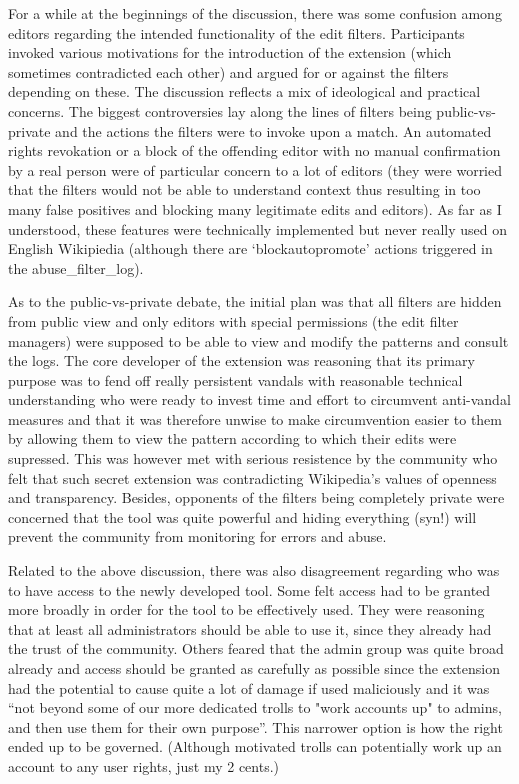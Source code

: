 For a while at the beginnings of the discussion, there was some confusion among editors regarding the intended functionality of the edit filters.
Participants invoked various motivations for the introduction of the extension (which sometimes contradicted each other) and argued for or against the filters depending on these.
The discussion reflects a mix of ideological and practical concerns.
The biggest controversies lay along the lines of filters being public-vs-private and the actions the filters were to invoke upon a match.
An automated rights revokation or a block of the offending editor with no manual confirmation by a real person were of particular concern to a lot of editors (they were worried that the filters would not be able to understand context thus resulting in too many false positives and blocking many legitimate edits and editors).
As far as I understood, these features were technically implemented but never really used on English Wikipiedia (although there are `blockautopromote' actions triggered in the abuse\_filter\_log). %

As to the public-vs-private debate, the initial plan was that all filters are hidden from public view and only editors with special permissions (the edit filter managers) were supposed to be able to view and modify the patterns and consult the logs.
The core developer of the extension was reasoning that its primary purpose was to fend off really persistent vandals with reasonable technical understanding who were ready to invest time and effort to circumvent anti-vandal measures
and that it was therefore unwise to make circumvention easier to them by allowing them to view the pattern according to which their edits were supressed.
This was however met with serious resistence by the community who felt that such secret extension was contradicting Wikipedia's values of openness and transparency.
Besides, opponents of the filters being completely private were concerned that the tool was quite powerful and hiding everything (syn!) will prevent the community from monitoring for errors and abuse.

Related to the above discussion, there was also disagreement regarding who was to have access to the newly developed tool.
Some felt access had to be granted more broadly in order for the tool to be effectively used.
They were reasoning that at least all administrators should be able to use it, since they already had the trust of the community.
Others feared that the admin group was quite broad already and access should be granted as carefully as possible since the extension had the potential to cause quite a lot of damage if used maliciously and it was ``not beyond some of our more dedicated trolls to "work accounts up" to admins, and then use them for their own purpose''.
This narrower option is how the right ended up to be governed.
(Although motivated trolls can potentially work up an account to any user rights, just my 2 cents.)

